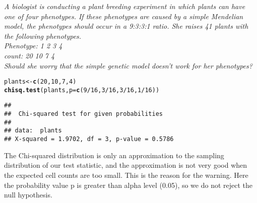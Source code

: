 \documentclass{article}\usepackage[]{graphicx}\usepackage[]{xcolor}
\makeatletter
\newcommand{\hlnum}[1]{\textcolor[rgb]{0.686,0.059,0.569}{#1}}%
\newcommand{\hlopt}[1]{\textcolor[rgb]{0,0,0}{#1}}%
\newcommand{\hldef}[1]{\textcolor[rgb]{0.345,0.345,0.345}{#1}}%
\newcommand{\hlkwb}[1]{\textcolor[rgb]{0.69,0.353,0.396}{#1}}%
\newcommand{\hlkwc}[1]{\textcolor[rgb]{0.333,0.667,0.333}{#1}}%
\newcommand{\hlkwd}[1]{\textcolor[rgb]{0.737,0.353,0.396}{\textbf{#1}}}%
\newenvironment{kframe}{%
 \def\at@end@of@kframe{}%
 \ifinner\ifhmode%
  \def\at@end@of@kframe{\end{minipage}}%
  \begin{minipage}{\columnwidth}%
 \fi\fi%
 \def\FrameCommand##1{\hskip\@totalleftmargin \hskip-\fboxsep
 \colorbox{shadecolor}{##1}\hskip-\fboxsep
     \hskip-\linewidth \hskip-\@totalleftmargin \hskip\columnwidth}%
 \MakeFramed {\advance\hsize-\width
   \@totalleftmargin\z@ \linewidth\hsize
   \@setminipage}}%
 {\par\unskip\endMakeFramed%
 \at@end@of@kframe}
\newenvironment{knitrout}{}{} %
\makeatother
\begin{document}
\emph{A biologist is conducting a plant breeding experiment in which plants can have one of four phenotypes. If these phenotypes are caused by a simple Mendelian model, the phenotypes should occur in a 9:3:3:1 ratio. She raises 41 plants with the following phenotypes.\\
Phenotype: 1 2 3 4\\
count:
20 10 7 4\\
Should she worry that the simple genetic model doesn't work for her phenotypes? }
\begin{knitrout}
\color{fgcolor}\begin{kframe}
\begin{alltt}
\hldef{plants} \hlkwb{<-} \hlkwd{c}\hldef{(}\hlnum{20}\hldef{,} \hlnum{10} \hldef{,}\hlnum{7} \hldef{,}\hlnum{4}\hldef{)}
\hlkwd{chisq.test}\hldef{(plants,} \hlkwc{p}\hldef{=}\hlkwd{c}\hldef{(}\hlnum{9}\hlopt{/}\hlnum{16}\hldef{,} \hlnum{3}\hlopt{/}\hlnum{16}\hldef{,} \hlnum{3}\hlopt{/}\hlnum{16}\hldef{,} \hlnum{1}\hlopt{/}\hlnum{16}\hldef{))}
\end{alltt}


{\ttfamily\noindent\color{warningcolor}{\#\# Warning in chisq.test(plants, p = c(9/16, 3/16, 3/16, 1/16)): Chi-squared approximation may be incorrect}}\begin{verbatim}
## 
## 	Chi-squared test for given probabilities
## 
## data:  plants
## X-squared = 1.9702, df = 3, p-value = 0.5786
\end{verbatim}
\end{kframe}
\end{knitrout}

The Chi-squared distribution is only an approximation to the sampling distribution of our test statistic, and the approximation is not very good when the expected cell counts are too small. This is the reason for the warning.
Here the probability value p is greater than alpha level (0.05), so we do not reject the null hypothesis.
\\
\\
\end{document}
